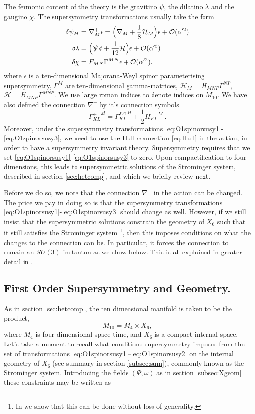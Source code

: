 \documentclass[12pt,a4paper]{article}
\def\a{\alpha'}
\def\OO{\mathcal{O}}
\def\H{\mathcal{H}}
\def\H{\mathcal{H}}
\theoremstyle{definition}
\begin{document}
The fermonic content of the theory is the gravitino $\psi$, the dilatino $\lambda$ and the gaugino $\chi$. The supersymmetry transformations usually take the form~\citep{Bergshoeff1989439}
\begin{align}
\label{eq:O1spinorsusy1}
\delta\psi_M &=\nabla^+_M\epsilon=\Big(\nabla_M+\frac{1}{8}\H_M\Big)\epsilon+\OO(\a^2) \\
\label{eq:O1spinorsusy2}
\delta\lambda&=\Big(\slashed\nabla\phi+\frac{1}{12}\H\Big)\epsilon+\OO(\a^2) \\
\label{eq:O1spinorsusy3}
\delta\chi&=F_{MN}\Gamma^{MN}\epsilon+\OO(\a^2) .
\end{align}
where $\epsilon$ is a ten-dimensional Majorana-Weyl spinor parameterising supersymmetry, $\Gamma^M$ are ten-dimensional gamma-matrices, $\H_M=H_{MNP}\Gamma^{NP}$, $\H=H_{MNP}\Gamma^{MNP}$. We use large roman indices to denote indices on $M_{10}$. We have also defined the connection $\nabla^+$ by it's connection symbols
\begin{equation*}
{\Gamma^+_{KL}}^M={\Gamma^{LC}_{KL}}^M+\frac{1}{2}{H_{KL}}^M\:.
\end{equation*}
Moreover, under the supersymmetry transformations \eqref{eq:O1spinorsusy1}-\eqref{eq:O1spinorsusy3}, we need to use the Hull connection \eqref{eq:Hull} in the action, in order to have a supersymmetry invariant theory. Supersymmetry requires that we set \eqref{eq:O1spinorsusy1}-\eqref{eq:O1spinorsusy3} to zero. Upon compactification to four dimensions, this leads to supersymmetric solutions of the Strominger system, described in section \ref{sec:hetcomp}, and which we briefly review next.

Before we do so, we note that the connection $\nabla^-$ in the action can be changed. The price we pay in doing so is that the supersymmetry transformations \eqref{eq:O1spinorsusy1}-\eqref{eq:O1spinorsusy3} should change as well. However, if we still insist that the supersymmetric solutions constrain the geometry of $X_6$ such that it still satisfies the Strominger system \footnote{In \cite{delaossa2014} we show that this can be done without loss of generality.}, then this imposes conditions on what the changes to the connection can be. In particular, it forces the connection to remain an $SU(3)$-instanton as we show below. This is all explained in greater detail in \cite{delaossa2014}.

\subsection{First Order Supersymmetry and Geometry.}
As in section \ref{sec:hetcomp}, the ten dimensional manifold is taken to be the product,
\begin{equation*}
M_{10}=M_4\times X_6,
\end{equation*}
where $M_4$ is four-dimensional space-time, and $X_6$ is a compact internal space. Let's take a moment to recall what conditions supersymmetry imposes from the set of transformations \eqref{eq:O1spinorsusy1}--\eqref{eq:O1spinorsusy2} on the internal geometry of $X_6$ (see summary in section \ref{subsec:sum}), commonly known as the Strominger system.  Introducing the fields $(\Psi, \omega)$ as in section \ref{subsec:Xgeom} these constraints may be written as
\end{document}
